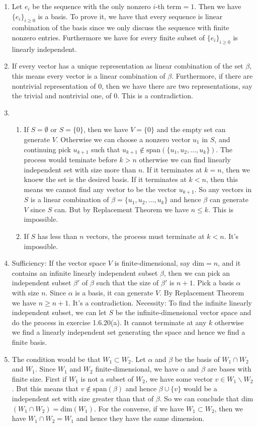\begin{enumerate}
\item Let $e_i$ be the sequence with the only nonzero $i$-th term$=1$. Then we have $\{e_i\}_{i\geq 0}$ is a basis. To prove it, we have that every sequence is linear combination of the basis since we only discuss the sequence with finite nonzero entries. Furthermore we have for every finite subset of $\{e_i\}_{i\geq 0}$ is linearly independent.
\item If every vector has a unique representation as linear combination of the set $\beta $, this means every vector is a linear combination of $\beta $. Furthermore, if there are nontrivial representation of $0$, then we have there are two representations, say the trivial and nontrivial one, of $0$. This is a contradiction.
\item \begin{enumerate}
\item If $S=\emptyset $ or $S=\{0\}$, then we have $V=\{0\}$ and the empty set can generate $V$. Otherwise we can choose a nonzero vector $u_1$ in $S$, and continuing pick $u_{k+1}$ such that $u_{k+1}\notin \mathrm{span}(\{u_1,u_2,\ldots ,u_k\})$. The process would teminate before $k>n$ otherwise we can find linearly independent set with size more than $n$. If it terminates at $k=n$, then we knoew the set is the desired basis. If it terminates at $k<n$, then this means we cannot find any vector to be the vector $u_{k+1}$. So any vectors in $S$ is a linear combination of $\beta =\{u_1,u_2,\ldots ,u_k\}$ and hence $\beta $ can generate $V$ since $S$ can. But by Replacement Theorem we have $n\leq k$. This is impossible.
\item If $S$ has less than $n$ vectors, the process must terminate at $k<n$. It's impossible.
\end{enumerate}
\item Sufficiency: If the vector space $V$ is finite-dimensional, say dim$=n$, and it contains an infinite linearly independent subset $\beta $, then we can pick an independent subset $\beta '$ of $\beta $ such that the size of $\beta '$ is $n+1$. Pick a basis $\alpha $ with size $n$. Since $\alpha $ is a basis, it can generate $V$. By Replacement Theorem we have $n\geq n+1$. It's a contradiction. Necessity: To find the infinite linearly independent subset, we can let $S$ be the infinite-dimensional vector space and do the process in exercise 1.6.20(a). It cannot terminate at any $k$ otherwise we find a linearly independent set generating the space and hence we find a finite basis.
\item The condition would be that $W_1\subset W_2$. Let $\alpha $ and $\beta $ be the basis of $W_1\cap W_2$ and $W_1$. Since $W_1$ and $W_2$ finite-dimensional, we have $\alpha $ and $\beta $ are bases with finite size. First if $W_1$ is not a subset of $W_2$, we have some vector $v\in W_1\backslash W_2$. But this means that $v\notin \mathrm{span}(\beta )$ and hence $\beta \cup \{v\}$ would be a independent set with size greater than that of $\beta $. So we can conclude that dim$(W_1 \cap W_2)=$dim$(W_1)$. For the converse, if we have $W_1\subset W_2$, then we have $W_1\cap W_2=W_1$ and hence they have the same dimension.

\end{enumerate}
